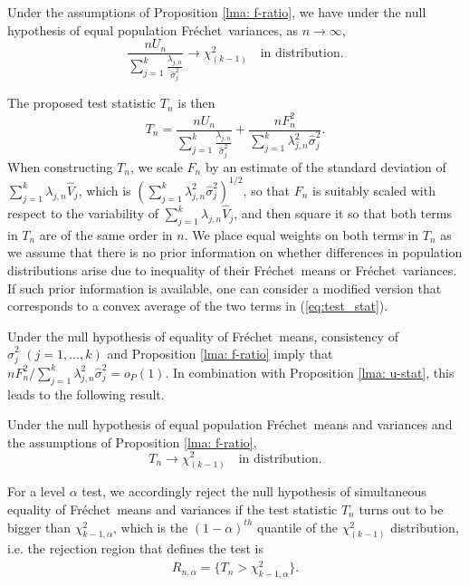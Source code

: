 \documentclass[lineno]{biometrika}
\newcommand{\be}{\begin{eqnarray}}
\newcommand{\ee}{\end{eqnarray}}
\newcommand{\la}{\label}
\def\F{Fr\'{e}chet}
\def\lra{\longrightarrow}
\begin{document}
\begin{proposition}
	\label{lma: u-stat}
	Under the assumptions of Proposition  \ref{lma: f-ratio}, we have under the null hypothesis of equal population \F \ variances, as $n \rightarrow \infty$, 	    	
	\begin{equation}
	\label{eq: u-stat}
	\frac{nU_n}{\sum_{j=1}^{k}\frac{\lambda_{j,n}}{ \hat{\sigma}_j^2}} \lra \chi^2_{(k-1)} \quad \text{in distribution}. 
	\end{equation}
\end{proposition}
The proposed test statistic $T_n$ is then  
\begin{equation}
\label{eq:test_stat}
T_n= \frac{n U_n }{\sum_{j=1}^{k}\frac{\lambda_{j,n}}{ \hat{\sigma}_j^2}} + \frac{nF_n^2}{\sum_{j=1}^{k}\lambda_{j,n}^2\hat{\sigma}_j^2}.
\end{equation}
When constructing $T_n$, we scale $F_n$ by an estimate of the standard deviation of $\sum_{j=1}^{k}\lambda_{j,n}\hat{V}_j$, which is $(\sum_{j=1}^{k}\lambda_{j,n}^2\hat{\sigma}_j^2)^{1/2}$,  so that $F_n$ is suitably scaled with respect to the variability of $\sum_{j=1}^{k}\lambda_{j,n}\hat{V}_j$,  and then square it so that both terms in $T_n$ are of the same order in $n$. We place equal weights on both terms in $T_n$ as we assume that there is no prior information on whether differences in population distributions arise due to inequality of their \F \ means or \F \ variances. If such prior information is available, one can consider a modified version that corresponds to a convex average of the two terms in (\ref{eq:test_stat}). 

Under  the null hypothesis of equality of \F \ means, consistency of $\hat{\sigma}_j^2 \,\, (j=1,\ldots,k)$ and Proposition \ref{lma: f-ratio} imply that  
$nF_n^2/\sum_{j=1}^{k}\lambda_{j,n}^2\hat{\sigma}_j^2=o_P(1)$. In combination with Proposition \ref{lma: u-stat}, this  leads to the following result.
\begin{theorem}
	\label{cor: test_stat}
	Under the null hypothesis of equal population \F \ means and variances and the assumptions of Proposition  \ref{lma: f-ratio},
	\begin{equation}
	\label{eq: null-dist}
	T_n \lra \chi^2_{(k-1)} \quad \text{in distribution}. 
	\end{equation}
\end{theorem}

For a level $\alpha$ test, we accordingly  reject the null hypothesis of simultaneous equality of \F \ means and variances if the test statistic $T_n$ turns out to be bigger than $\chi^2_{k-1,\alpha}$, which is the $(1-\alpha)^{th}$ quantile of the $\chi^2_{(k-1)}$ distribution, i.e. the rejection region that defines the  test is 
\be  R_{n,\alpha}=\{T_n > \chi^2_{k-1,\alpha}\}. \la{rej} \ee	     
\end{document}
